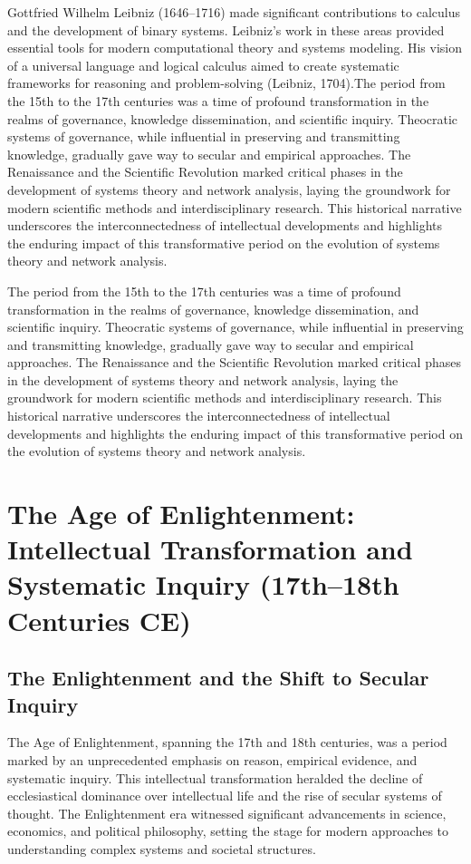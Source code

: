 \documentclass[twocolumn]{article}
\begin{document}
\textcolor{primary}{Gottfried Wilhelm Leibniz (1646–1716) made significant contributions to calculus and the development of binary systems. Leibniz’s work in these areas provided essential tools for modern computational theory and systems modeling. His vision of a universal language and logical calculus aimed to create systematic frameworks for reasoning and problem-solving (Leibniz, 1704).The period from the 15th to the 17th centuries was a time of profound transformation in the realms of governance, knowledge dissemination, and scientific inquiry. Theocratic systems of governance, while influential in preserving and transmitting knowledge, gradually gave way to secular and empirical approaches. The Renaissance and the Scientific Revolution marked critical phases in the development of systems theory and network analysis, laying the groundwork for modern scientific methods and interdisciplinary research. This historical narrative underscores the interconnectedness of intellectual developments and highlights the enduring impact of this transformative period on the evolution of systems theory and network analysis.}

\textcolor{secondary}{The period from the 15th to the 17th centuries was a time of profound transformation in the realms of governance, knowledge dissemination, and scientific inquiry. Theocratic systems of governance, while influential in preserving and transmitting knowledge, gradually gave way to secular and empirical approaches. The Renaissance and the Scientific Revolution marked critical phases in the development of systems theory and network analysis, laying the groundwork for modern scientific methods and interdisciplinary research. This historical narrative underscores the interconnectedness of intellectual developments and highlights the enduring impact of this transformative period on the evolution of systems theory and network analysis.}

\section{The Age of Enlightenment: Intellectual Transformation and Systematic Inquiry (17th–18th Centuries CE)}

\subsection{The Enlightenment and the Shift to Secular Inquiry}

\textcolor{primary}{The Age of Enlightenment, spanning the 17th and 18th centuries, was a period marked by an unprecedented emphasis on reason, empirical evidence, and systematic inquiry. This intellectual transformation heralded the decline of ecclesiastical dominance over intellectual life and the rise of secular systems of thought. The Enlightenment era witnessed significant advancements in science, economics, and political philosophy, setting the stage for modern approaches to understanding complex systems and societal structures.}
\end{document}
